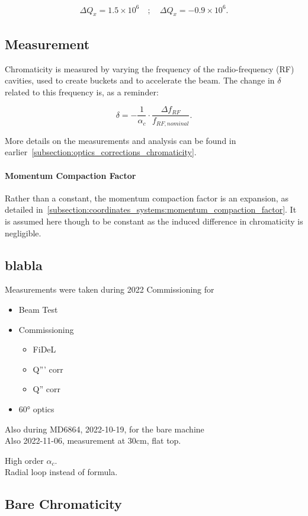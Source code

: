 \begin{equation}
    \begin{aligned}
        \Delta Q_x =  1.5 \times 10^6 \quad;\quad
        \Delta Q_x = -0.9 \times 10^6.
    \end{aligned}
\end{equation}




\subsection{Measurement}

Chromaticity is measured by varying the frequency of the radio-frequency (RF) cavities, used to
create buckets and to accelerate the beam. The change in $\delta$ related to this frequency is, as a
reminder:

\begin{equation}
    \delta = - \frac{1}{\alpha_c} \cdot \frac{\Delta f_{RF}}{f_{RF,nominal}}.
\end{equation}

More details on the measurements and analysis can be found in
earlier~\cref{subsection:optics_corrections_chromaticity}.

\paragraph{Momentum Compaction Factor} Rather than a constant, the momentum compaction factor is an 
expansion, as detailed in~\cref{subsection:coordinates_systems:momentum_compaction_factor}. It is
assumed here though to be constant as the induced difference in chromaticity is negligible.



\subsection{blabla}

Measurements were taken during 2022 Commissioning for 
\begin{itemize}
    \item Beam Test
    \item Commissioning
    \begin{itemize}
        \item FiDeL
        \item Q''' corr
        \item Q'' corr
    \end{itemize}
    \item 60° optics
\end{itemize}

Also during MD6864, 2022-10-19, for the bare machine \\
Also 2022-11-06, measurement at 30cm, flat top.

High order $\alpha_c$. \\
Radial loop instead of formula.



\subsection{Bare Chromaticity}
